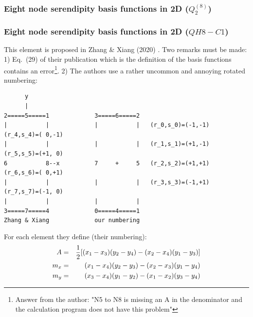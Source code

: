 






\subsubsection{Eight node serendipity basis functions in 2D ($Q_2^{(8)}$)}
\label{sec:serendipity2D}














\subsubsection{Eight node serendipity basis functions in 2D ($QH8-C1$)}
\label{sec:serendipity2Db}
 

This element is proposed in Zhang \& Xiang (2020) \cite{zhxi20}. Two remarks
must be made: 1) Eq.~(29) of their publication which is the definition
of the basis functions contains an error\footnote{
Answer from the author: "N5 to N8 is missing an A in the denominator and 
the calculation program does not have this problem"}. 2) The authors use a rather 
uncommon and annoying rotated numbering:
\begin{verbatim}
      y
      |
2=====5=====1             3=====6=====2
|           |             |           |   (r_0,s_0)=(-1,-1)   (r_4,s_4)=( 0,-1)
|           |             |           |   (r_1,s_1)=(+1,-1)   (r_5,s_5)=(+1, 0)
6           8--x          7     +     5   (r_2,s_2)=(+1,+1)   (r_6,s_6)=( 0,+1)
|           |             |           |   (r_3,s_3)=(-1,+1)   (r_7,s_7)=(-1, 0)
|           |             |           |    
3=====7=====4             0=====4=====1
Zhang & Xiang             our numbering
\end{verbatim}

For each element they define (their numbering):
\begin{eqnarray}
A   &=& \frac{1}{2} [ (x_1-x_3)(y_2-y_4)-(x_2-x_4)(y_1-y_3) ] \nonumber\\
m_x &=& (x_1-x_4)(y_2-y_3)-(x_2-x_3)(y_1-y_4) \nonumber\\
m_y &=& (x_3-x_4)(y_1-y_2)-(x_1-x_2)(y_3-y_4) \nonumber
\end{eqnarray}

